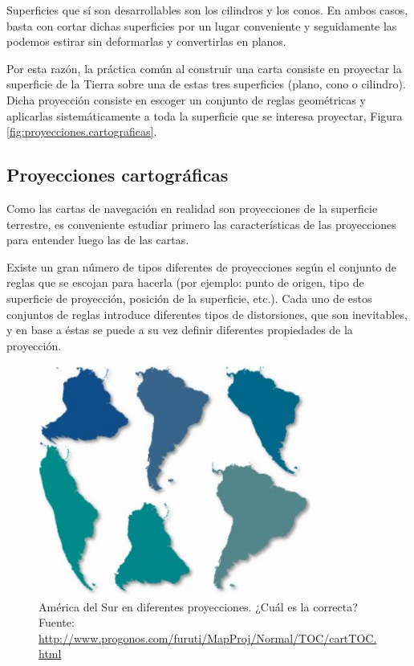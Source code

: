 \documentclass[a4paper,12pt,twoside]{article}
\begin{document}
Superficies que sí son desarrollables son los cilindros y los conos. En ambos casos, basta con cortar dichas superficies por un lugar conveniente y seguidamente las podemos estirar sin deformarlas y convertirlas en planos.

Por esta razón, la práctica común al construir una carta consiste en proyectar la superficie de la Tierra sobre una de estas tres superficies (plano, cono o cilindro). Dicha proyección consiste en escoger un conjunto de reglas geométricas y aplicarlas sistemáticamente a toda la superficie que se interesa proyectar, Figura \ref{fig:proyecciones.cartograficas}.

\subsection{Proyecciones cartogr\'aficas}
\label{sec:proyecciones.cartograficas}

Como las cartas de navegación en realidad son proyecciones de la superficie terrestre, es conveniente estudiar primero las características de las proyecciones para entender luego las de las cartas. 

 Existe un gran número de tipos diferentes de proyecciones según el conjunto de reglas que se escojan para hacerla (por ejemplo: punto de origen, tipo de superficie de proyección, posición de la superficie, etc.). Cada uno de estos conjuntos de reglas introduce diferentes tipos de distorsiones, que son inevitables, y en base a éstas se puede a su vez definir diferentes propiedades de la proyección.

\begin{figure}[!h]
  \centering
  \includegraphics[width=0.8\textwidth]{./Imagenes/comparacion-proyecciones.jpg}
  \caption{Am\'erica del Sur en diferentes proyecciones. ¿Cu\'al es la correcta? \\{\footnotesize Fuente: \url{http://www.progonos.com/furuti/MapProj/Normal/TOC/cartTOC.html}}}
  \label{fig:comparacion.proyecciones.cartograficas}
\end{figure}
\end{document}
